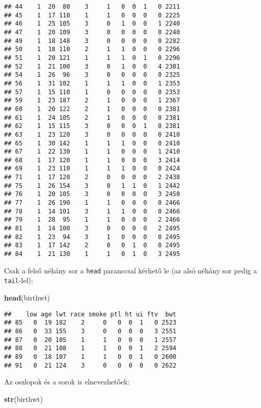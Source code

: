 \documentclass[]{book}
\newenvironment{Shaded}{\begin{snugshade}}{\end{snugshade}}
\newcommand{\KeywordTok}[1]{\textcolor[rgb]{0.13,0.29,0.53}{\textbf{#1}}}
\newcommand{\NormalTok}[1]{#1}
\begin{document}
\begin{verbatim}
## 44    1  20  80    3     1   0  0  1   0 2211
## 45    1  17 110    1     1   0  0  0   0 2225
## 46    1  25 105    3     0   1  0  0   1 2240
## 47    1  20 109    3     0   0  0  0   0 2240
## 49    1  18 148    3     0   0  0  0   0 2282
## 50    1  18 110    2     1   1  0  0   0 2296
## 51    1  20 121    1     1   1  0  1   0 2296
## 52    1  21 100    3     0   1  0  0   4 2301
## 54    1  26  96    3     0   0  0  0   0 2325
## 56    1  31 102    1     1   1  0  0   1 2353
## 57    1  15 110    1     0   0  0  0   0 2353
## 59    1  23 187    2     1   0  0  0   1 2367
## 60    1  20 122    2     1   0  0  0   0 2381
## 61    1  24 105    2     1   0  0  0   0 2381
## 62    1  15 115    3     0   0  0  1   0 2381
## 63    1  23 120    3     0   0  0  0   0 2410
## 65    1  30 142    1     1   1  0  0   0 2410
## 67    1  22 130    1     1   0  0  0   1 2410
## 68    1  17 120    1     1   0  0  0   3 2414
## 69    1  23 110    1     1   1  0  0   0 2424
## 71    1  17 120    2     0   0  0  0   2 2438
## 75    1  26 154    3     0   1  1  0   1 2442
## 76    1  20 105    3     0   0  0  0   3 2450
## 77    1  26 190    1     1   0  0  0   0 2466
## 78    1  14 101    3     1   1  0  0   0 2466
## 79    1  28  95    1     1   0  0  0   2 2466
## 81    1  14 100    3     0   0  0  0   2 2495
## 82    1  23  94    3     1   0  0  0   0 2495
## 83    1  17 142    2     0   0  1  0   0 2495
## 84    1  21 130    1     1   0  1  0   3 2495
\end{verbatim}

Csak a felső néhány sor a \texttt{head} paranccsal kérhető le (az alsó
néhány sor pedig a \texttt{tail}-lel):

\begin{Shaded}
\begin{Highlighting}[]
\KeywordTok{head}\NormalTok{(birthwt)}
\end{Highlighting}
\end{Shaded}

\begin{verbatim}
##    low age lwt race smoke ptl ht ui ftv  bwt
## 85   0  19 182    2     0   0  0  1   0 2523
## 86   0  33 155    3     0   0  0  0   3 2551
## 87   0  20 105    1     1   0  0  0   1 2557
## 88   0  21 108    1     1   0  0  1   2 2594
## 89   0  18 107    1     1   0  0  1   0 2600
## 91   0  21 124    3     0   0  0  0   0 2622
\end{verbatim}

Az oszlopok és a sorok is elnevezhetőek:

\begin{Shaded}
\begin{Highlighting}[]
\KeywordTok{str}\NormalTok{(birthwt)}
\end{Highlighting}
\end{Shaded}
\end{document}
